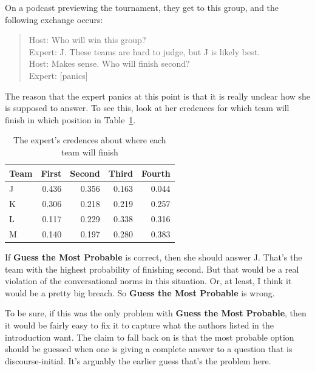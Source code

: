 \documentclass[
  11pt,
  letterpaper,
  DIV=11,
  numbers=noendperiod,
  twoside]{scrartcl}
\begin{document}
On a podcast previewing the tournament, they get to this group, and the
following exchange occurs:

\begin{quote}
Host: Who will win this group?\\
Expert: J. These teams are hard to judge, but J is likely best.\\
Host: Makes sense. Who will finish second?\\
Expert: {[}panics{]}
\end{quote}

The reason that the expert panics at this point is that it is really
unclear how she is supposed to answer. To see this, look at her
credences for which team will finish in which position in
Table~\ref{tbl-place-prob-sec-2}.

{

\begin{longtable}[]{@{}lrrrr@{}}

\caption{\label{tbl-place-prob-sec-2}The expert's credences about where
each team will finish}

\tabularnewline

\toprule\noalign{}
Team & First & Second & Third & Fourth \\
\midrule\noalign{}
\endhead
\bottomrule\noalign{}
\endlastfoot
J & 0.436 & 0.356 & 0.163 & 0.044 \\
K & 0.306 & 0.218 & 0.219 & 0.257 \\
L & 0.117 & 0.229 & 0.338 & 0.316 \\
M & 0.140 & 0.197 & 0.280 & 0.383 \\

\end{longtable}

}

If \textbf{Guess the Most Probable} is correct, then she should answer
J. That's the team with the highest probability of finishing second. But
that would be a real violation of the conversational norms in this
situation. Or, at least, I think it would be a pretty big breach. So
\textbf{Guess the Most Probable} is wrong.

To be sure, if this was the only problem with \textbf{Guess the Most
Probable}, then it would be fairly easy to fix it to capture what the
authors listed in the introduction want. The claim to fall back on is
that the most probable option should be guessed when one is giving a
complete answer to a question that is discourse-initial. It's arguably
the earlier guess that's the problem here.
\end{document}
